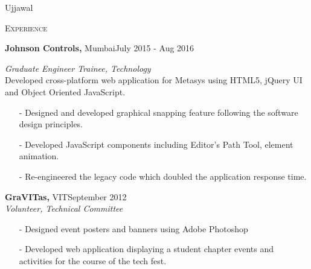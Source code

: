 \documentclass[a4paper, 11pt]{article}
\begin{document}

\begin{minipage}{0.45\textwidth}
\begin{Huge}
	{\selectfont
		\flushleft
		Ujjawal
	}
\end{Huge}
\end{minipage}

\hrulefill 

\vspace{5mm}

\begin{minipage}[t]{0.15\textwidth}
	\small \textsc{Experience}
\end{minipage}
\hfill
\begin{minipage}[t]{0.80\textwidth}
	\noindent \textbf{Johnson Controls,} Mumbai\hfill {\scriptsize \textrm{July 2015 - Aug 2016}}\\
	{\small \textit{Graduate Engineer Trainee, Technology}\\
	Developed cross-platform web application for Metasys using HTML5, jQuery UI and Object Oriented JavaScript.
	\begin{itemize}[noitemsep, topsep=0pt]
		\item[-] Designed and developed graphical snapping feature following the software design principles. 
		\item[-] Developed JavaScript components including Editor's Path Tool, element animation.
		\item[-] Re-engineered the legacy code which doubled the application response time.\\
	\end{itemize}
	}
	
	\noindent \textbf{GraVITas,} VIT\hfill {\scriptsize \textrm{September 2012}}\\
	\small \textit{Volunteer, Technical Committee}

	\begin{itemize}[noitemsep, topsep=0pt]
		\item[-] Designed event posters and banners using Adobe Photoshop 
		\item[-] Developed web application displaying a student chapter events and activities for the course of the tech fest.
	\end{itemize}
	
\end{minipage}

\vspace{5mm}
\end{document}
